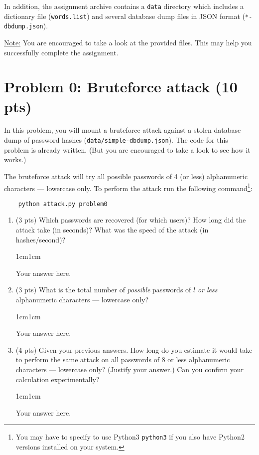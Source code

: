 \documentclass[11pt,letterpaper]{article}
\newenvironment{answer}{\em \color{blue} \begin{adjustwidth}{1cm}{1cm}}{\end{adjustwidth}}
\begin{document}
\noindent
In addition, the assignment archive contains a \texttt{data} directory which includes a dictionary file (\texttt{words.list}) and several database dump files in JSON format (\texttt{*-dbdump.json}).

\bigskip

\noindent
\underline{Note:} You are encouraged to take a look at the provided files. This may help you successfully complete the assignment.

\newpage
\section*{Problem 0: Bruteforce attack (10 pts)}
%
In this problem, you will mount a bruteforce attack against a stolen database dump of password hashes (\texttt{data/simple-dbdump.json}). The code for this problem is already written. (But you are encouraged to take a look to see how it works.)

The bruteforce attack will try all possible passwords of 4 (or less) alphanumeric characters --- lowercase only. To perform the attack run the following command\footnote{You may have to specify to use Python3 \texttt{python3} if you also have Python2 versions installed on your system.}:
%
\begin{Verbatim}
	python attack.py problem0
\end{Verbatim}
%

\begin{enumerate}
	\item (3 pts) Which passwords are recovered (for which users)? How long did the attack take (in seconds)? What was the speed of the attack (in hashes/second)?
	
	\begin{answer}
	
		Your answer here.
		
	\end{answer}
	
	\item (3 pts) What is the total number of {\em possible} passwords of $l$ {\em or less} alphanumeric characters --- lowercase only? 
	
	\begin{answer}
	
		Your answer here.
		
	\end{answer}
	
	\item (4 pts) Given your previous answers. How long do you estimate it would take to perform the same attack on all passwords of $8$ or less alphanumeric characters --- lowercase only? (Justify your answer.) Can you confirm your calculation experimentally?
	
	\begin{answer}
	
		Your answer here.
		
	\end{answer}
	
\end{enumerate}
\end{document}
